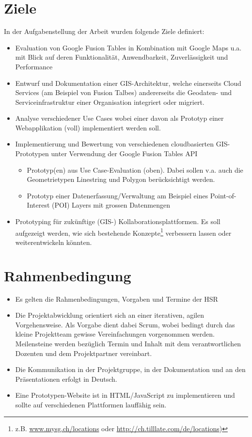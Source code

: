 \section{Ziele}
In der Aufgabenstellung der Arbeit wurden folgende Ziele definiert:
\begin{itemize}
\item Evaluation von Google Fusion Tables in Kombination mit Google Maps u.a. mit Blick auf deren Funktionalität, Anwendbarkeit, Zuverlässigkeit und Performance
\item Entwurf und Dokumentation einer \gls{GIS}-Architektur, welche einerseits Cloud Services (am Beispiel von Fusion Talbes) andererseits die Geodaten- und Serviceinfrastruktur einer Organisation integriert oder migriert.
\item Analyse verschiedener Use Cases wobei einer davon als Prototyp einer Webapplikation (voll) implementiert werden soll. 
\item Implementierung und Bewertung von verschiedenen cloudbasierten \gls{GIS}-Prototypen unter Verwendung der Google Fusion Tables API
\begin{itemize}
	\item Prototyp(en) aus Use Case-Evaluation (oben). Dabei sollen v.a. auch die Geometrietypen Linestring und Polygon berücksichtigt werden.
	\item Prototyp einer Datenerfassung/Verwaltung am Beispiel eines Point-of-Interest (POI) Layers mit grossen Datenmengen
\end{itemize}
\item Prototyping für zukünftige (\gls{GIS}-) Kollaborationsplattformen. Es soll aufgezeigt werden, wie sich bestehende Konzepte\footnote{z.B. \url{www.mysg.ch/locations} oder \url{http://ch.tilllate.com/de/locations})} verbessern lassen oder weiterentwickeln könnten.
\end{itemize}

\section{Rahmenbedingung}
\begin{itemize}
\item Es gelten die Rahmenbedingungen, Vorgaben und Termine der HSR
\item Die Projektabwicklung orientiert sich an einer iterativen, agilen Vorgehensweise. Als Vorgabe dient dabei Scrum, wobei bedingt durch das kleine Projektteam gewisse Vereinfachungen vorgenommen werden. Meilensteine werden bezüglich Termin und Inhalt mit dem verantwortlichen Dozenten und dem Projektpartner vereinbart.
\item Die Kommunikation in der Projektgruppe, in der Dokumentation und an den Präsentationen erfolgt in Deutsch.
\item Eine Prototypen-Website ist in HTML/JavaScript zu implementieren und sollte auf verschiedenen Plattformen lauffähig sein.
\end{itemize}

